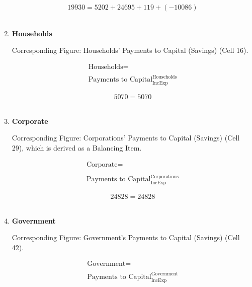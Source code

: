 \begin{enumerate}
\begin{equation} \nonumber
19930 = 5202+24695+119+(-10086)
\end{equation}\\


\item \textbf {Households}

Corresponding Figure: Households' Payments to Capital (Savings) (Cell 16).

\begin{equation}
\begin{split}
\text{Households} =  \\ \\
\text{Payments to Capital}^\text{Households}_\text{IncExp}
\end{split} \label{eq:2.5.49}
\end{equation}

\begin{equation} \nonumber
5070 = 5070
\end{equation}\\


\item \textbf {Corporate}

Corresponding Figure: Corporations' Payments to Capital (Savings) (Cell 29), which is derived as a Balancing Item.

\begin{equation}
\begin{split}
\text{Corporate} =  \\ \\
\text{Payments to Capital}^\text{Corporations}_\text{IncExp}
\end{split} \label{eq:2.5.50}
\end{equation}

\begin{equation} \nonumber
24828 = 24828
\end{equation}\\

\newpage

\item \textbf {Government}

Corresponding Figure: Government's Payments to Capital (Savings) (Cell 42).

\begin{equation}
\begin{split}
\text{Government} =  \\ \\
\text{Payments to Capital}^\text{Government}_\text{IncExp}
\end{split} \label{eq:2.5.51}
\end{equation}


\end{enumerate}
